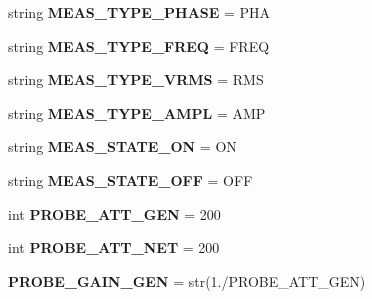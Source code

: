 \begin{DoxyCompactItemize}
\item 
\mbox{\label{namespacescope_ac3bb41135a9245f923d6e578658d31ec}} 
string {\bfseries M\+E\+A\+S\+\_\+\+T\+Y\+P\+E\+\_\+\+P\+H\+A\+SE} = \textquotesingle{}P\+HA\textquotesingle{}
\item 
\mbox{\label{namespacescope_af327379d32d120465496304c64a56979}} 
string {\bfseries M\+E\+A\+S\+\_\+\+T\+Y\+P\+E\+\_\+\+F\+R\+EQ} = \textquotesingle{}F\+R\+EQ\textquotesingle{}
\item 
\mbox{\label{namespacescope_aa469bc481f7afec0b5a5c6ed6990f02e}} 
string {\bfseries M\+E\+A\+S\+\_\+\+T\+Y\+P\+E\+\_\+\+V\+R\+MS} = \textquotesingle{}R\+MS\textquotesingle{}
\item 
\mbox{\label{namespacescope_aac94f6893b748eebf34f87ec091e9abb}} 
string {\bfseries M\+E\+A\+S\+\_\+\+T\+Y\+P\+E\+\_\+\+A\+M\+PL} = \textquotesingle{}A\+MP\textquotesingle{}
\item 
\mbox{\label{namespacescope_adb80ae0d2825d9ff2c7de0fdc13cdb6b}} 
string {\bfseries M\+E\+A\+S\+\_\+\+S\+T\+A\+T\+E\+\_\+\+ON} = \textquotesingle{}ON\textquotesingle{}
\item 
\mbox{\label{namespacescope_a81f68fbe4e7e40b5f84cff5f03701855}} 
string {\bfseries M\+E\+A\+S\+\_\+\+S\+T\+A\+T\+E\+\_\+\+O\+FF} = \textquotesingle{}O\+FF\textquotesingle{}
\item 
\mbox{\label{namespacescope_aa01863bb201442b92343852240394340}} 
int {\bfseries P\+R\+O\+B\+E\+\_\+\+A\+T\+T\+\_\+\+G\+EN} = 200
\item 
\mbox{\label{namespacescope_ab543b09e3184e6d92cc6a035c1560c3a}} 
int {\bfseries P\+R\+O\+B\+E\+\_\+\+A\+T\+T\+\_\+\+N\+ET} = 200
\item 
\mbox{\label{namespacescope_a8aa4c871d4c572043584e2a7625afdd2}} 
{\bfseries P\+R\+O\+B\+E\+\_\+\+G\+A\+I\+N\+\_\+\+G\+EN} = str(1./P\+R\+O\+B\+E\+\_\+\+A\+T\+T\+\_\+\+G\+EN)
\item 
\mbox{\label{namespacescope_a200a2e0ae58277c243d2578da9f2de29}} 

\end{DoxyCompactItemize}
